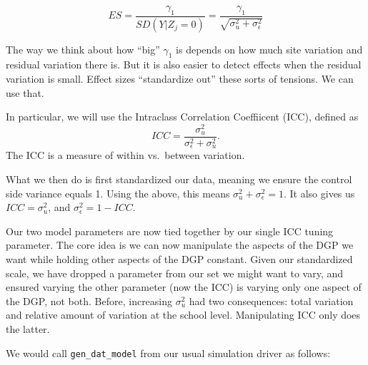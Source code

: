 \documentclass[
]{book}
\begin{document}
\[ ES = \frac{\gamma_1}{SD( Y | Z_j = 0 )} = \frac{\gamma_1}{\sqrt{ \sigma^2_u + \sigma^2_\epsilon } } \]

The way we think about how ``big'' \(\gamma_1\) is depends on how much site variation and residual variation there is.
But it is also easier to detect effects when the residual variation is small.
Effect sizes ``standardize out'' these sorts of tensions. We can use that.

In particular, we will use the Intraclass Correlation Coeffiicent (ICC), defined as
\[ ICC = \frac{ \sigma^2_u }{ \sigma^2_\epsilon + \sigma^2_u } . \]
The ICC is a measure of within vs.~between variation.

What we then do is first standardized our data, meaning we ensure the control side variance equals 1.
Using the above, this means \(\sigma^2_u + \sigma^2_\epsilon = 1\).
It also gives us \(ICC = \sigma^2_u\), and \(\sigma^2_\epsilon = 1 - ICC\).

Our two model parameters are now tied together by our single ICC tuning parameter.
The core idea is we can now manipulate the aspects of the DGP we want while holding other aspects of the DGP constant.
Given our standardized scale, we have dropped a parameter from our set we might want to vary, and ensured varying the other parameter (now the ICC) is varying only one aspect of the DGP, not both.
Before, increasing \(\sigma^2_u\) had two consequences: total variation and relative amount of variation at the school level.
Manipulating ICC only does the latter.

We would call \texttt{gen\_dat\_model} from our usual simulation driver as follows:
\end{document}
